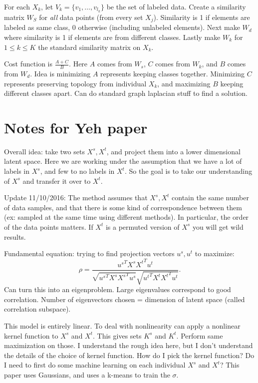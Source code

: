 \documentclass{article}[11pt]
\begin{document}
For each $X_k$, let $V_k = \{v_1,\ldots,v_{l_k}\}$ be the set of labeled
data. Create a similarity matrix $W_S$ for \emph{all} data points (from every
set $X_j$). Similarity is 1 if elements are labeled as same class, 0 otherwise
(including unlabeled elements). Next make $W_d$ where similarity is 1 if
elements are from different classes. Lastly make $W_k$ for $1\leq k \leq K$ the
standard similarity matrix on $X_k$.

Cost function is $\frac{A+C}{B}$. Here $A$ comes from $W_s$, $C$ comes from
$W_k$, and $B$ comes from $W_d$. Idea is minimizing $A$ represents keeping
classes together. Minimizing $C$ represents preserving topology from individual
$X_k$, and maximizing $B$ keeping different classes apart. Can do standard graph
laplacian stuff to find a solution.

\section{Notes for Yeh paper \cite{Yeh14}}
Overall idea: take two sets $X^s,X^t$, and project them into a lower dimensional
latent space. Here we are working under the assumption that we have a lot of
labels in $X^s$, and few to no labels in $X^t$. So the goal is to take our
understanding of $X^s$ and transfer it over to $X^t$.

Update 11/10/2016: The method assumes that $X^s,X^t$ contain the same number of data samples, and that there is some kind of correspondence between them (ex: sampled at the same time using different methods). In particular, the order of the data points matters. If $X^t$ is a permuted version of $X^s$ you will get wild results.

Fundamental equation: trying to find projection vectors $u^s,u^t$ to maximize:
\[\rho = \frac{{u^s}^T X^s{X^t}^T
    u^t}{\sqrt{{u^s}^TX^s{X^s}^Tu^s}\sqrt{{u^t}^TX^t{X^t}^Tu^t}}.\] Can turn
this into an eigenproblem. Large eigenvalues correspond to good
correlation. Number of eigenvectors chosen = dimension of latent space (called
correlation subspace).

This model is entirely linear. To deal with nonlinearity can apply a nonlinear
kernel function to $X^s$ and $X^t$. This gives sets $K^s$ and $K^t$. Perform
same maximization on those. I understand the rough idea here, but I don't
understand the details of the choice of kernel function. How do I pick the
kernel function? Do I need to first do some machine learning on each individual
$X^s$ and $X^t$? This paper uses Gaussians, and uses a k-means to train the
$\sigma$.
\end{document}

